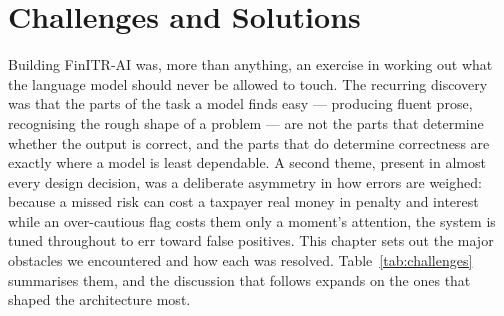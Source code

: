 
\chapter{Challenges and Solutions}
\label{chap:challenges}

Building FinITR-AI was, more than anything, an exercise in working out what the
language model should never be allowed to touch. The recurring discovery was
that the parts of the task a model finds easy --- producing fluent prose,
recognising the rough shape of a problem --- are not the parts that determine
whether the output is correct, and the parts that do determine correctness are
exactly where a model is least dependable. A second theme, present in almost
every design decision, was a deliberate asymmetry in how errors are weighed:
because a missed risk can cost a taxpayer real money in penalty and interest
while an over-cautious flag costs them only a moment's attention, the system is
tuned throughout to err toward false positives. This chapter sets out the major
obstacles we encountered and how each was resolved.
Table~\ref{tab:challenges} summarises them, and the discussion that follows
expands on the ones that shaped the architecture most.

